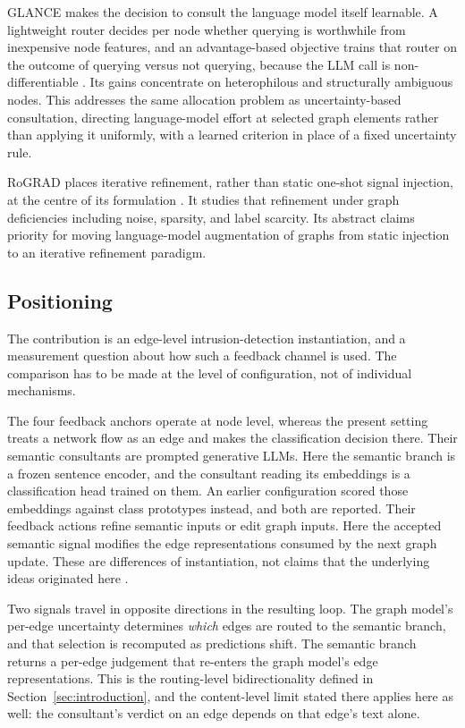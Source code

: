 GLANCE makes the decision to consult the language model itself learnable. A lightweight
router decides per node whether querying is worthwhile from inexpensive node features, and
an advantage-based objective trains that router on the outcome of querying versus not
querying, because the LLM call is non-differentiable \citep{loveland2025glance}. Its gains
concentrate on heterophilous and structurally ambiguous nodes. This addresses the same
allocation problem as uncertainty-based consultation, directing language-model effort at
selected graph elements rather than applying it uniformly, with a learned criterion in
place of a fixed uncertainty rule.

RoGRAD places iterative refinement, rather than static one-shot signal injection, at the
centre of its formulation \citep{wang2025rograd}. It studies that refinement under graph
deficiencies including noise, sparsity, and label scarcity. Its abstract claims priority
for moving language-model augmentation of graphs from static injection to an iterative
refinement paradigm.

\subsection{Positioning}

The contribution is an edge-level intrusion-detection instantiation, and a measurement
question about how such a feedback channel is used. The comparison has to be made
at the level of configuration, not of individual mechanisms.

The four feedback anchors operate at node level, whereas the present setting treats a
network flow as an edge and makes the classification decision there. Their semantic
consultants are prompted generative LLMs. Here the semantic branch is a frozen sentence
encoder, and the consultant reading its embeddings is a classification head trained on them.
An earlier configuration scored those embeddings against class prototypes instead, and both
are reported. Their feedback actions refine
semantic inputs or edit graph inputs. Here the accepted semantic signal modifies the edge
representations consumed by the next graph update. These are differences of instantiation,
not claims that the underlying ideas originated here
\citep{qiao2025login,thapaliya2025das,loveland2025glance,wang2025rograd}.

Two signals travel in opposite directions in the resulting loop. The graph model's
per-edge uncertainty determines \emph{which} edges are
routed to the semantic branch, and that selection is recomputed as predictions shift. The
semantic branch returns a per-edge judgement that re-enters the graph model's edge
representations. This is the routing-level bidirectionality defined in
Section~\ref{sec:introduction}, and the content-level limit stated there applies here as well:
the consultant's verdict on an edge depends on that edge's text alone.

